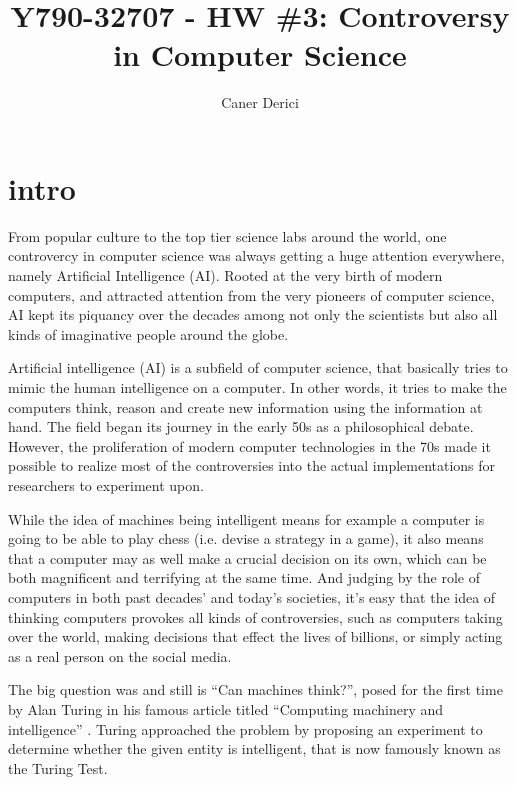 \documentclass{article}
\title{Y790-32707 - HW \#3: Controversy in Computer Science}
\author{}
\date{Caner Derici}
\begin{document}
\doublespacing

\maketitle


\section{intro}

From popular culture to the top tier science labs around the world,
one controvercy in computer science was always getting a huge
attention everywhere, namely Artificial Intelligence (AI). Rooted at
the very birth of modern computers, and attracted attention from the
very pioneers of computer science, AI kept its piquancy over the
decades among not only the scientists but also all kinds of
imaginative people around the globe.

Artificial intelligence (AI) is a subfield of computer science, that
basically tries to mimic the human intelligence on a computer. In
other words, it tries to make the computers think, reason and create
new information using the information at hand. The field began its
journey in the early 50s as a philosophical debate. However, the
proliferation of modern computer technologies in the 70s made it
possible to realize most of the controversies into the actual
implementations for researchers to experiment upon.

While the idea of machines being intelligent means for example a
computer is going to be able to play chess (i.e. devise a strategy in
a game), it also means that a computer may as well make a crucial
decision on its own, which can be both magnificent and terrifying at
the same time. And judging by the role of computers in both past
decades' and today's societies, it's easy that the idea of thinking
computers provokes all kinds of controversies, such as computers
taking over the world, making decisions that effect the lives of
billions, or simply acting as a real person on the social media.

The big question was and still is ``Can machines think?'', posed for
the first time by Alan Turing in his famous article titled ``Computing
machinery and intelligence'' \cite{turing}. Turing approached the
problem by proposing an experiment to determine whether the given
entity is intelligent, that is now famously known as the Turing Test. 
\end{document}

